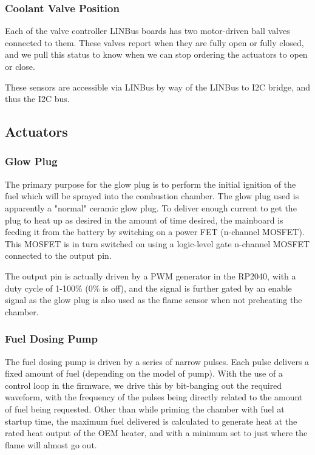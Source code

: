 \documentclass[lettersize,journal]{IEEEtran}
\begin{document}
\subsubsection{Coolant Valve Position}
Each of the valve controller LINBus boards has two motor-driven ball valves connected to them.  These valves report when they are fully open or fully closed, and we pull this status to know when we can stop ordering the actuators to open or close. 

These sensors are accessible via LINBus by way of the LINBus to I2C bridge, and thus the I2C bus.


\subsection{Actuators}
\subsubsection{Glow Plug}
The primary purpose for the glow plug is to perform the initial ignition of the fuel which will be sprayed into the combustion chamber.  The glow plug used is apparently a "normal" ceramic glow plug.  To deliver enough current to get the plug to heat up as desired in the amount of time desired, the mainboard is feeding it from the battery by switching on a power FET (n-channel MOSFET).  This MOSFET is in turn switched on using a logic-level gate n-channel MOSFET connected to the output pin.

The output pin is actually driven by a PWM generator in the RP2040, with a duty cycle of 1-100\% (0\% is off), and the signal is further gated by an enable signal as the glow plug is also used as the flame sensor when not preheating the chamber.

\subsubsection{Fuel Dosing Pump}
The fuel dosing pump is driven by a series of narrow pulses.  Each pulse delivers a fixed amount of fuel (depending on the model of pump).  With the use of a control loop in the firmware, we drive this by bit-banging out the required waveform, with the frequency of the pulses being directly related to the amount of fuel being requested.  Other than while priming the chamber with fuel at startup time, the maximum fuel delivered is calculated to generate heat at the rated heat output of the OEM heater, and with a minimum set to just where the flame will almost go out.
\end{document}
